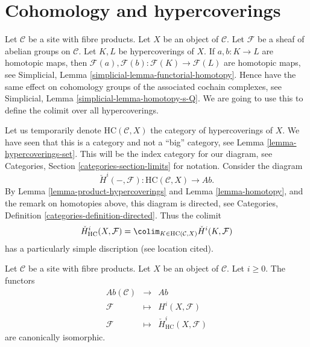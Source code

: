

























\section{Cohomology and hypercoverings}
\label{section-cohomology}

\noindent
Let $\mathcal{C}$ be a site with fibre products.
Let $X$ be an object of $\mathcal{C}$.
Let $\mathcal{F}$ be a sheaf of abelian groups on $\mathcal{C}$.
Let $K, L$ be hypercoverings of $X$.
If $a, b : K \to L$ are homotopic maps,
then $\mathcal{F}(a), \mathcal{F}(b) : \mathcal{F}(K) \to \mathcal{F}(L)$
are homotopic maps, see
Simplicial, Lemma \ref{simplicial-lemma-functorial-homotopy}.
Hence have the same effect on cohomology groups of the associated
cochain complexes, see
Simplicial, Lemma \ref{simplicial-lemma-homotopy-s-Q}.
We are going to use this to define the colimit over all
hypercoverings.

\medskip\noindent
Let us temporarily denote $\text{HC}(\mathcal{C}, X)$
the category of hypercoverings of $X$. We have seen that
this is a category and not a ``big'' category,
see Lemma \ref{lemma-hypercoverings-set}.
This will be the index category for our diagram, see
Categories, Section \ref{categories-section-limits} for notation.
Consider the diagram
$$
\check{H}^i(-, \mathcal{F}) :
\text{HC}(\mathcal{C}, X)
\longrightarrow
\textit{Ab}.
$$
By Lemma \ref{lemma-product-hypercoverings} and
Lemma \ref{lemma-homotopy}, and the remark on homotopies above,
this diagram is directed, see
Categories, Definition \ref{categories-definition-directed}.
Thus the colimit
$$
\check{H}^i_{\text{HC}}(X, \mathcal{F})
=
\colim_{K \in \text{HC}(\mathcal{C}, X)}
\check{H}^i(K, \mathcal{F})
$$
has a particularly simple discription (see location cited).

\begin{theorem}
\label{theorem-cohomology-hypercoverings}
Let $\mathcal{C}$ be a site with fibre products.
Let $X$ be an object of $\mathcal{C}$. Let $i \geq 0$.
The functors
\begin{eqnarray*}
\textit{Ab}(\mathcal{C}) & \longrightarrow & \textit{Ab} \\
\mathcal{F} & \longmapsto & H^i(X, \mathcal{F}) \\
\mathcal{F} & \longmapsto & \check{H}^i_{\text{HC}}(X, \mathcal{F})
\end{eqnarray*}
are canonically isomorphic.
\end{theorem}

